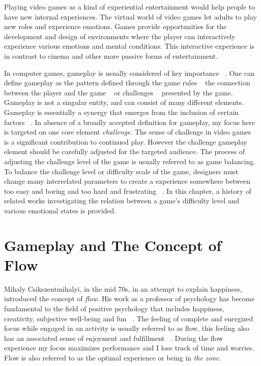 
Playing video games as a kind of experiential entertainment would help people to have new internal experiences. The virtual world of video games let adults to play new roles and experience emotions. Games provide opportunities for the development and design of environments where the player can interactively experience various emotions and mental conditions. This interactive experience is in contrast to cinema and other more passive forms of entertainment.

In computer games, gameplay is usually considered of key importance ~\cite{rollings2006fundamentals, malone1982makes}. One can define gameplay as the pattern defined through the game rules ~\cite{salen2004rules, pajares2008understanding} the connection between the player and the game ~\cite{laramee2002game} or challenges ~\cite{rollings2003andrew} presented by the game. Gameplay is not a singular entity, and can consist of many different elements. Gameplay is essentially a synergy that emerges from the inclusion of certain factors ~\cite{rollings2003andrew}. In absence of a broadly accepted definition for gameplay, my focus here is targeted on one core element \textit{challenge}. The sense of challenge in video games is a significant contribution to continued play. However the challenge gameplay element should be carefully adjusted for the targeted audience. The process of adjusting the challenge level of the game is usually referred to as game balancing. To balance the challenge level or difficulty scale of the game, designers must change many interrelated parameters to create a experience somewhere between too easy and boring and too hard and frustrating ~\cite{koster2013theory}. In this chapter, a history of related works investigating the relation between a game's difficulty level and various emotional states is provided.

\section{Gameplay and The Concept of Flow}
Mihaly Csikszentmihalyi, in the mid 70s, in an attempt to explain happiness, introduced the concept of \textit{flow}. His work as a professor of psychology has become fundamental to the field of positive psychology that includes happiness, creativity, subjective well-being and fun ~\cite{csikszentmihalyi1990flow}. The feeling of complete and energized focus while engaged in an activity is usually referred to as flow, this feeling also has an associated sense of enjoyment and fulfillment ~\cite{csikszentmihalyi1990flow}. During the flow experience my focus maximizes performance and I lose track of time and worries. Flow is also referred to as the optimal experience or being in \textit{the zone}.

